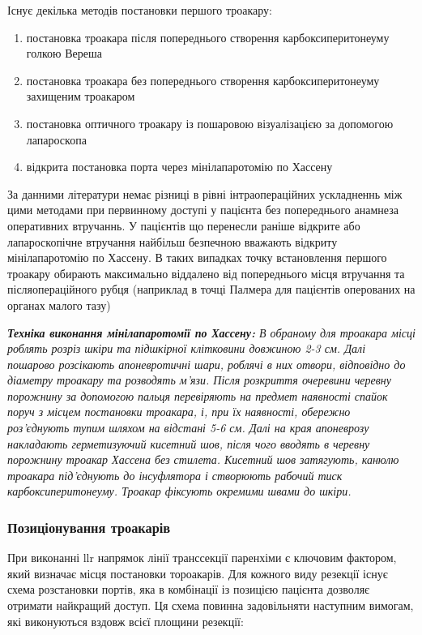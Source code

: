 \begin{refsection}
Існує декілька методів постановки першого троакару:
\begin{enumerate}
    \item постановка троакара після попереднього створення карбоксиперитонеуму голкою Вереша
    \item постановка троакара без попереднього створення карбоксиперитонеуму захищеним троакаром
    \item постановка оптичного троакару із пошаровою візуалізацією за допомогою лапароскопа
    \item відкрита постановка порта через мінілапаротомію по Хассену
\end{enumerate}
 
За данними літератури немає різниці в рівні інтраопераційних ускладненнь між цими методами при первинному доступі у пацієнта без попереднього анамнеза оперативних втручаннь. У пацієнтів що перенесли раніше відкрите або лапароскопічне втручання найбільш безпечною вважають відкриту мінілапаротомію по Хассену. В таких випадках точку встановлення першого троакару обирають максимально віддалено від попереднього місця втручання та післяопераційного рубця (наприклад в точці Палмера для пацієнтів оперованих на органах малого тазу)

\textit{ \textbf{Техніка виконання мінілапаротомії по Хассену:} В обраному для троакара місці роблять розріз шкіри та підшкірної клітковини довжиною 2-3 см. Далі пошарово розсікають апоневротичні шари, роблячі в них отвори, відповідно до діаметру троакару та розводять м'язи. Після розкриття очеревини черевну порожнину за допомогою пальця перевіряють на предмет наявності спайок поруч з місцем постановки троакара, і, при їх наявності, обережно роз'єднують тупим шляхом на відстані 5-6 см. Далі на края апоневрозу накладають герметизуючий кисетний шов, після чого вводять в черевну порожнину троакар Хассена без стилета. Кисетний шов затягують, канюлю троакара під'єднують до інсуфлятора і створюють рабочий тиск карбоксиперитонеуму. Троакар фіксують окремими швами до шкіри.}


\subsubsection{Позиціонування троакарів}

При виконанні \acrshort{llr} напрямок лінії транссекції паренхіми є ключовим фактором, який визначає місця постановки тороакарів. Для кожного виду резекції існує схема розстановки портів, яка в комбінації із позицією пацієнта дозволяє отримати найкращий доступ. Ця схема повинна задовільняти наступним вимогам, які виконуються вздовж всієї площини резекції:


\end{refsection}
